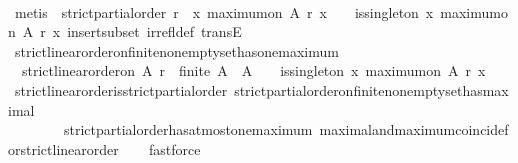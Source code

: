 \begin{isabellebody}
\ \ \ \ \isanewline
\ \ \ \ \isamarkupfalse%
\ {\isacharparenleft}metis\ {\isacartoucheopen}{\isasymnot}\ {\isacharparenleft}strict{\isacharunderscore}partial{\isacharunderscore}order\ r\ {\isasymlongrightarrow}\ {\isacharbraceleft}x{\isachardot}\ maximum{\isacharunderscore}on\ A\ r\ x{\isacharbraceright}\ {\isasymnoteq}\ {\isasymemptyset}\ {\isasymlongrightarrow}\ is{\isacharunderscore}singleton\ {\isacharbraceleft}x{\isachardot}\ maximum{\isacharunderscore}on\ A\ r\ x{\isacharbraceright}{\isacharparenright}{\isacartoucheclose}\ insert{\isacharunderscore}subset\ irrefl{\isacharunderscore}def\ transE{\isacharparenright}\isanewline
{}\isamarkupfalse%
%
\endisatagproof
{\isafoldproof}%
%
\isadelimproof
\isanewline
%
\endisadelimproof
\isanewline
{}\isamarkupfalse%
\ strict{\isacharunderscore}linear{\isacharunderscore}order{\isacharunderscore}on{\isacharunderscore}finite{\isacharunderscore}non{\isacharunderscore}empty{\isacharunderscore}set{\isacharunderscore}has{\isacharunderscore}one{\isacharunderscore}maximum\ {\isacharcolon}\isanewline
\ \ {\isachardoublequoteopen}strict{\isacharunderscore}linear{\isacharunderscore}order{\isacharunderscore}on\ A\ r\ {\isasymlongrightarrow}\ finite\ A\ {\isasymlongrightarrow}\ A\ {\isasymnoteq}\ {\isasymemptyset}\ {\isasymlongrightarrow}\ is{\isacharunderscore}singleton\ {\isacharbraceleft}x{\isachardot}\ maximum{\isacharunderscore}on\ A\ r\ x{\isacharbraceright}{\isachardoublequoteclose}\isanewline
%
\isadelimproof
\ \ %
\endisadelimproof
%
\isatagproof
{}\isamarkupfalse%
\ strict{\isacharunderscore}linear{\isacharunderscore}order{\isacharunderscore}is{\isacharunderscore}strict{\isacharunderscore}partial{\isacharunderscore}order\ strict{\isacharunderscore}partial{\isacharunderscore}order{\isacharunderscore}on{\isacharunderscore}finite{\isacharunderscore}non{\isacharunderscore}empty{\isacharunderscore}set{\isacharunderscore}has{\isacharunderscore}maximal\ \isanewline
\ \ \ \ \ \ \ \ strict{\isacharunderscore}partial{\isacharunderscore}order{\isacharunderscore}has{\isacharunderscore}at{\isacharunderscore}most{\isacharunderscore}one{\isacharunderscore}maximum\ maximal{\isacharunderscore}and{\isacharunderscore}maximum{\isacharunderscore}coincide{\isacharunderscore}for{\isacharunderscore}strict{\isacharunderscore}linear{\isacharunderscore}order\isanewline
\ \ \isamarkupfalse%
\ fastforce%
\endisatagproof
{\isafoldproof}%
%
\isadelimproof
\isanewline
%
\endisadelimproof
\isanewline
\isanewline
\isanewline
\isanewline
\isanewline
{}\isamarkupfalse%

\end{isabellebody}
